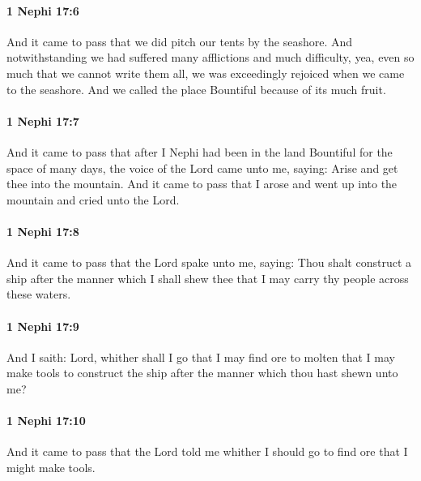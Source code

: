 		\paragraph{1 Nephi 17:6} %
			\label{1NEPHI-17-6}

			And it came to pass that we did pitch our tents by the seashore.
			And notwithstanding we had suffered many afflictions and much difficulty,
			yea, even so much that we cannot write them all,
			we was exceedingly rejoiced when we came to the seashore.
			And we called the place Bountiful because of its much fruit.

		\paragraph{1 Nephi 17:7} %
			\label{1NEPHI-17-7}

			And it came to pass that after I Nephi had been in the land Bountiful
			for the space of many days,
			the voice of the Lord came unto me, saying:
			Arise and get thee into the mountain.
			And it came to pass that I arose and went up into the mountain
			and cried unto the Lord.

		\paragraph{1 Nephi 17:8} %
			\label{1NEPHI-17-8}

			And it came to pass that the Lord spake unto me, saying:
			Thou shalt construct a ship after the manner which I shall shew thee
			that I may carry thy people across these waters.

		\paragraph{1 Nephi 17:9} %
			\label{1NEPHI-17-9}

			And I saith:
			Lord, whither shall I go that I may find ore to molten
			that I may make tools to construct the ship
			after the manner which thou hast shewn unto me?

		\paragraph{1 Nephi 17:10} %
			\label{1NEPHI-17-10}

			And it came to pass that the Lord told me
			whither I should go to find ore that I might make tools.


